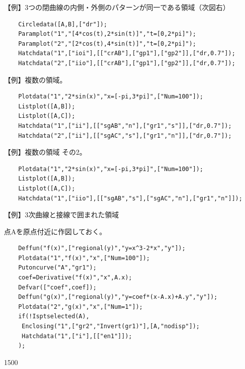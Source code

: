 \documentclass[papersize,a4paper,12pt,uplatex]{jsarticle}
\begin{document}
\begin{description}
【例】3つの閉曲線の内側・外側のパターンが同一である領域（次図右）
\begin{verbatim}
    Circledata([A,B],["dr"]);
    Paramplot("1","[4*cos(t),2*sin(t)]","t=[0,2*pi]");
    Paramplot("2","[2*cos(t),4*sin(t)]","t=[0,2*pi]");
    Hatchdata("1",["ioi"],[["crAB"],["gp1"],["gp2"]],["dr,0.7"]);
    Hatchdata("2",["iio"],[["crAB"],["gp1"],["gp2"]],["dr,0.7"]);
\end{verbatim}
\vspace{\baselineskip}
\hspace{5mm}  \hspace{5mm}    

【例】複数の領域。
\begin{verbatim}
    Plotdata("1","2*sin(x)","x=[-pi,3*pi]",["Num=100"]);
    Listplot([A,B]);
    Listplot([A,C]);
    Hatchdata("1",["ii"],[["sgAB","n"],["gr1","s"]],["dr,0.7"]);
    Hatchdata("2",["ii"],[["sgAC","s"],["gr1","n"]],["dr,0.7"]);
\end{verbatim}
\begin{center}
\begin{center}  \end{center}
\end{center}

【例】複数の領域  その2。
\begin{verbatim}
    Plotdata("1","2*sin(x)","x=[-pi,3*pi]",["Num=100"]);
    Listplot([A,B]);
    Listplot([A,C]);
    Hatchdata("1",["iio"],[["sgAB","s"],["sgAC","n"],["gr1","n"]]);
\end{verbatim}
\begin{center}
\begin{center}  \end{center}
\end{center}


【例】3次曲線と接線で囲まれた領域

    点Aを原点付近に作図しておく。
\begin{verbatim}
    Deffun("f(x)",["regional(y)","y=x^3-2*x","y"]);
    Plotdata("1","f(x)","x",["Num=100"]);
    Putoncurve("A","gr1");
    coef=Derivative("f(x)","x",A.x);
    Defvar(["coef",coef]);
    Deffun("g(x)",["regional(y)","y=coef*(x-A.x)+A.y","y"]);
    Plotdata("2","g(x)","x",["Num=1"]);
    if(!Isptselected(A),
     Enclosing("1",["gr2","Invert(gr1)"],[A,"nodisp"]);
     Hatchdata("1",["i"],[["en1"]]);
    );

\end{verbatim}
\begin{layer}{150}{0}
\end{layer}


\end{description}
\end{document}
